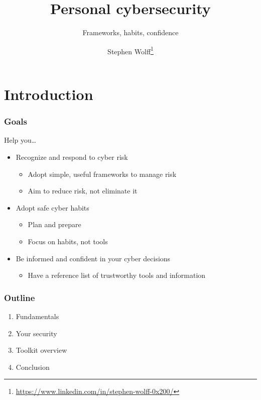 \documentclass[blue]{beamer}
\begin{document}
\title{Personal cybersecurity}
\subtitle{Frameworks, habits, confidence}
\author{Stephen Wolff\thanks{\url{https://www.linkedin.com/in/stephen-wolff-0x200/}}}



\begin{frame}
\titlepage
\end{frame}



\section{Introduction}



\begin{frame}
\frametitle{Goals}

Help you\ldots{}

\begin{itemize}
  \item Recognize and respond to cyber risk
  \begin{itemize}
    \item Adopt simple, useful frameworks to manage risk
    \item Aim to reduce risk, not eliminate it
  \end{itemize}
  \item Adopt safe cyber habits
  \begin{itemize}
    \item Plan and prepare
    \item Focus on habits, not tools
  \end{itemize}
  \item Be informed and confident in your cyber decisions
  \begin{itemize}
    \item Have a reference list of trustworthy tools and information
  \end{itemize}
\end{itemize}

\end{frame}



\begin{frame}
\frametitle{Outline}

\begin{enumerate}
  \item Fundamentals
  \item Your security
  \item Toolkit overview
  \item Conclusion
\end{enumerate}

\end{frame}
\end{document}

